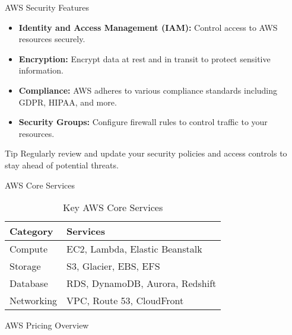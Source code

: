 \documentclass{beamer}
\begin{document}
\begin{frame}{AWS Security Features}
    \begin{itemize}
        \item \textbf{Identity and Access Management (IAM):} Control access to AWS resources securely.
        \item \textbf{Encryption:} Encrypt data at rest and in transit to protect sensitive information.
        \item \textbf{Compliance:} AWS adheres to various compliance standards including GDPR, HIPAA, and more.
        \item \textbf{Security Groups:} Configure firewall rules to control traffic to your resources.
    \end{itemize}
    \pause
    \begin{mybox}[toprule=1mm, bottomrule=1mm, toptitle=1mm, bottomtitle=1mm]{Tip}
    Regularly review and update your security policies and access controls to stay ahead of potential threats.
    \end{mybox}
\end{frame}

\begin{frame}{AWS Core Services}
    \begin{table}[]
    \centering
    \begin{tabular}{ll}
        \toprule
        \textbf{Category} & \textbf{Services} \\
        \midrule
        Compute & EC2, Lambda, Elastic Beanstalk \\
        Storage & S3, Glacier, EBS, EFS \\
        Database & RDS, DynamoDB, Aurora, Redshift \\
        Networking & VPC, Route 53, CloudFront \\
        \bottomrule
    \end{tabular}
    \caption{Key AWS Core Services}
    \end{table}
\end{frame}

\begin{frame}{AWS Pricing Overview}
    \begin{center}
    \end{center}
    \vspace{-1ex}
\end{frame}
\end{document}
